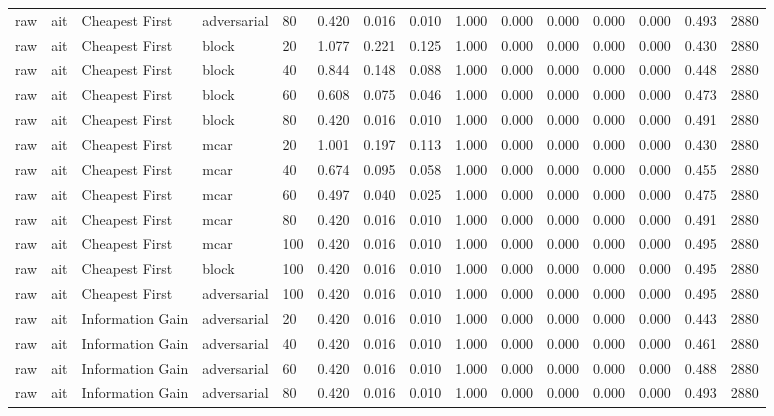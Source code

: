 \begin{table}[!ht]
{\begin{tabular}{lllllllllllllll}
raw & ait & Cheapest First & adversarial & 80 & 0.420 & 0.016 & 0.010 & 1.000 & 0.000 & 0.000 & 0.000 & 0.000 & 0.493 & 2880 \\
raw & ait & Cheapest First & block & 20 & 1.077 & 0.221 & 0.125 & 1.000 & 0.000 & 0.000 & 0.000 & 0.000 & 0.430 & 2880 \\
raw & ait & Cheapest First & block & 40 & 0.844 & 0.148 & 0.088 & 1.000 & 0.000 & 0.000 & 0.000 & 0.000 & 0.448 & 2880 \\
raw & ait & Cheapest First & block & 60 & 0.608 & 0.075 & 0.046 & 1.000 & 0.000 & 0.000 & 0.000 & 0.000 & 0.473 & 2880 \\
raw & ait & Cheapest First & block & 80 & 0.420 & 0.016 & 0.010 & 1.000 & 0.000 & 0.000 & 0.000 & 0.000 & 0.491 & 2880 \\
raw & ait & Cheapest First & mcar & 20 & 1.001 & 0.197 & 0.113 & 1.000 & 0.000 & 0.000 & 0.000 & 0.000 & 0.430 & 2880 \\
raw & ait & Cheapest First & mcar & 40 & 0.674 & 0.095 & 0.058 & 1.000 & 0.000 & 0.000 & 0.000 & 0.000 & 0.455 & 2880 \\
raw & ait & Cheapest First & mcar & 60 & 0.497 & 0.040 & 0.025 & 1.000 & 0.000 & 0.000 & 0.000 & 0.000 & 0.475 & 2880 \\
raw & ait & Cheapest First & mcar & 80 & 0.420 & 0.016 & 0.010 & 1.000 & 0.000 & 0.000 & 0.000 & 0.000 & 0.491 & 2880 \\
raw & ait & Cheapest First & mcar & 100 & 0.420 & 0.016 & 0.010 & 1.000 & 0.000 & 0.000 & 0.000 & 0.000 & 0.495 & 2880 \\
raw & ait & Cheapest First & block & 100 & 0.420 & 0.016 & 0.010 & 1.000 & 0.000 & 0.000 & 0.000 & 0.000 & 0.495 & 2880 \\
raw & ait & Cheapest First & adversarial & 100 & 0.420 & 0.016 & 0.010 & 1.000 & 0.000 & 0.000 & 0.000 & 0.000 & 0.495 & 2880 \\
raw & ait & Information Gain & adversarial & 20 & 0.420 & 0.016 & 0.010 & 1.000 & 0.000 & 0.000 & 0.000 & 0.000 & 0.443 & 2880 \\
raw & ait & Information Gain & adversarial & 40 & 0.420 & 0.016 & 0.010 & 1.000 & 0.000 & 0.000 & 0.000 & 0.000 & 0.461 & 2880 \\
raw & ait & Information Gain & adversarial & 60 & 0.420 & 0.016 & 0.010 & 1.000 & 0.000 & 0.000 & 0.000 & 0.000 & 0.488 & 2880 \\
raw & ait & Information Gain & adversarial & 80 & 0.420 & 0.016 & 0.010 & 1.000 & 0.000 & 0.000 & 0.000 & 0.000 & 0.493 & 2880 \\

\end{tabular}}
\end{table}
